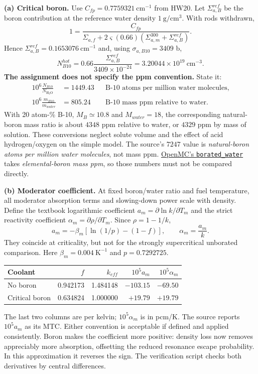 \begin{adaptedsolution}

\textbf{(a) Critical boron.} Use $C_{fp}=0.7759321~\mathrm{cm^{-1}}$
from HW20. Let $\Sigma_{a,B}^{ref}$ be the boron contribution at the
reference water density $1~\mathrm{g/cm^3}$. With rods withdrawn,
\[
1=\frac{C_{fp}}{\Sigma_{a,f}+2\varsigma(0.66)
(\Sigma_{a,m}^{300}+\Sigma_{a,B}^{ref})}.
\]
Hence $\Sigma_{a,B}^{ref}=0.1653076~\mathrm{cm^{-1}}$ and, using
$\sigma_{a,B10}=3409$ b,
\[
N_{B10}^{hot}=0.66\frac{\Sigma_{a,B}^{ref}}{3409\times10^{-24}}
=3.20044\times10^{19}~\mathrm{cm^{-3}}.
\]
\textbf{The assignment does not specify the ppm convention.} State it:
\begin{align*}
10^6\frac{N_{B10}}{N_{\mathrm{H_2O}}}&=\boxed{1449.43}
&&\text{B-10 atoms per million water molecules},\\
10^6\frac{m_{B10}}{m_{water}}&=\boxed{805.24}
&&\text{B-10 mass ppm relative to water}.
\end{align*}
With 20 atom-\% B-10, $M_B\simeq10.8$ and $M_{water}=18$,
the corresponding natural-boron mass ratio is about $4348$ ppm relative to
water, or $\boxed{4329}$ ppm by mass of solution. These conversions neglect
solute volume and the effect of acid hydrogen/oxygen on the simple model.
The source's $7247$ value is \emph{natural-boron atoms per million water
molecules}, not mass ppm. \href{https://docs.openmc.org/en/stable/pythonapi/generated/openmc.model.borated_water.html}{OpenMC's \texttt{borated\_water}} takes
\emph{elemental-boron mass ppm}, so those numbers must not be compared directly.

\textbf{(b) Moderator coefficient.} At fixed boron/water ratio and fuel
temperature, all moderator absorption terms and slowing-down power scale
with density. Define the textbook logarithmic coefficient
$a_m=\partial\ln k/\partial T_m$ and the strict reactivity coefficient
$\alpha_m=\partial\rho/\partial T_m$. Since $\rho=1-1/k$,
\[
a_m=-\beta_m[\ln(1/p)-(1-f)],\qquad
\alpha_m=\frac{a_m}{k}.
\]
They coincide at criticality, but not for the strongly supercritical
unborated comparison. Here $\beta_m=0.004~\mathrm{K^{-1}}$ and
$p=0.7292725$.
\begin{center}
\begin{tabular}{lrrrr}
\toprule
Coolant & $f$ & $k_{eff}$ & $10^5a_m$ & $10^5\alpha_m$\\\midrule
No boron&0.942173&1.484148&$-103.15$&$-69.50$\\
Critical boron&0.634824&1.000000&$+19.79$&$+19.79$\\\bottomrule
\end{tabular}
\end{center}
The last two columns are per kelvin; $10^5\alpha_m$ is in pcm/K.
The source reports $10^5a_m$ as its MTC. Either convention is acceptable
if defined and applied consistently. Boron makes the coefficient more
positive: density loss now removes appreciably more absorption, offsetting
the reduced resonance escape probability. In this approximation it reverses
the sign. The verification script checks both derivatives by central differences.

\end{adaptedsolution}

